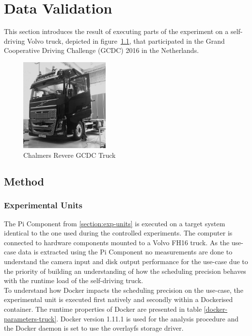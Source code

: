 \chapter{Data Validation}\label{section:data-validation}

This section introduces the result of executing parts of the experiment on a self-driving Volvo truck, depicted in figure~\ref{truck}, that participated in the Grand Cooperative Driving Challenge (GCDC) 2016 in the Netherlands. \\

\begin{figure}[ht]
\centering
\caption{Chalmers Revere GCDC Truck}
\label{truck}
\includegraphics[width=0.4\textwidth]{./figure/truck.png}
\end{figure}


\section{Method}
\label{sec:truck-method}

\subsection{Experimental Units}
\label{sec:truck-expun}

The Pi Component from \ref{section:exp-units} is executed on a target system identical to the one used during the controlled experiments. The computer is connected to hardware components mounted to a Volvo FH16 truck. As the use-case data is extracted using the Pi Component no measurements are done to understand the camera input and disk output performance for the use-case due to the priority of building an understanding of how the scheduling precision behaves with the runtime load of the self-driving truck.\\

To understand how Docker impacts the scheduling precision on the use-case, the experimental unit is executed first natively and secondly within a Dockerised container. The runtime properties of Docker are presented in table \ref{docker-parameters-truck}. Docker version 1.11.1 is used for the analysis procedure and the Docker daemon is set to use the overlayfs storage driver.



